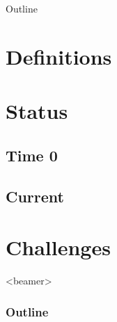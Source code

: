 \documentclass[notes=hide,xcolor=svgnames,professionalfonts,lualatex]{beamer}
\begin{document}
\begin{frame}{Outline}
  \begin{tikzpicture}[]
  \end{tikzpicture}
  \tableofcontents
\addtocounter{framenumber}{-1}
\end{frame}


\section{Definitions}

\section{Status}
\subsection{Time 0}

\subsection{Current}

\section{Challenges}
\begin{frame}<beamer>
 \frametitle{Outline}
  \tableofcontents[currentsection]
\end{frame}

\end{document}

